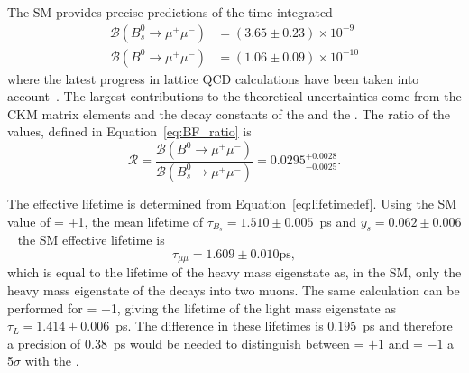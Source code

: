 The SM provides precise predictions of the time-integrated \bmumu \BFs~\cite{Bobeth:2013uxa} %
\begin{align}
\mathcal{B}(B^0_{s} \to \mu^+ \mu^-)& = (3.65 \pm 0.23) \times 10^{-9}\\
\mathcal{B}(B^0 \to\mu^+ \mu^-)& = (1.06 \pm 0.09) \times 10^{-10}
\end{align}
where the latest progress in lattice QCD calculations have been taken into account~\cite{Bazavov:2011aa, Na:2012kp,Witzel:2013sla}. %
The largest contributions to the theoretical uncertainties come from the CKM matrix elements and the decay constants of the \bs and the \bd.
The ratio of the \BF values, defined in Equation~\ref{eq:BF_ratio} is~\cite{CMS:2014xfa} 
\begin{equation}
\mathcal{R} = \frac{\mathcal{B}(B^0 \to\mu^+ \mu^-)}{\mathcal{B}(B^0_{s} \to \mu^+ \mu^-)} = 0.0295^{+0.0028}_{-0.0025}.
\end{equation}


The \bsmumu effective lifetime is determined from Equation~\ref{eq:lifetimedef}. Using the SM value of \ADG = +1, the \bs mean lifetime of $\tau_{B_{s}} = 1.510 \pm 0.005$~ps and $y_{s} = 0.062 \pm 0.006$~\cite{Olive:2016xmw,Amhis:2016xyh} the SM effective lifetime is
\begin{equation}
\tau_{\mu\mu} = 1.609 \pm 0.010 \mathrm{ps},
\end{equation}
which is equal to the lifetime of the heavy \bs mass eigenstate as, in the SM, only the heavy mass eigenstate of the \bs decays into two muons. The same calculation can be performed for \ADG = $-$1, giving the lifetime of the light mass \bs eigenstate as $\tau_{L} = 1.414 \pm 0.006$~ps.
The difference in these lifetimes is $0.195$~ps and therefore a precision of 0.38~ps would be needed to distinguish between \ADG = $+1$ and \ADG = $-1$ a 5$\sigma$ with the \el. 



